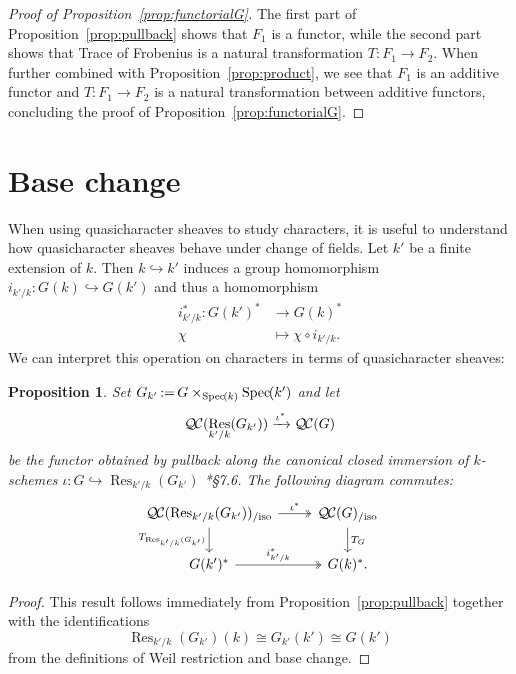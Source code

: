 \documentclass{amsart}
\theoremstyle{plain}
\newtheorem{proposition}[theorem]{Proposition}
\theoremstyle{definition}
\theoremstyle{remark}
\DeclareMathOperator{\Res}{Res}
\newcommand{\Spec}[1]{{\operatorname{Spec}\hskip-1pt( #1 )}}
\newcommand{\ceq}{{\, :=\, }}
\newcommand{\QC}{{\mathcal{Q\hskip-0.8pt C}}}
\newcommand{\QCiso}[1]{\QC(#1)_{/\text{iso}}}
\newcommand{\TrFrob}[1]{T_{#1}}
\begin{document}
\begin{proof}[Proof of Proposition~\ref{prop:functorialG}]
The first part of Proposition~\ref{prop:pullback} shows that $F_1$ is a functor,
while the second part shows that Trace of Frobenius is a natural transformation
$T: F_1 \to F_2$. When further combined with Proposition~\ref{prop:product},
we see that $F_1$ is an additive functor and $T: F_1 \to F_2$ is a natural
transformation between additive functors,
concluding the proof of Proposition~\ref{prop:functorialG}.
\end{proof}

\section{Base change}\label{sec:basechange}

When using quasicharacter sheaves to study characters, it is useful to understand
how quasicharacter sheaves behave under change of fields.
Let $k'$ be a finite extension of $k$. Then $k \hookrightarrow k'$ induces a group homomorphism
$i_{k'/k} : G(k) \hookrightarrow G(k')$ and thus a homomorphism
\begin{align*}
i_{k'/k}^* : G(k')^* &\to G(k)^* \\
\chi &\mapsto \chi\circ i_{k'/k}.
\end{align*}
We can interpret this operation on characters in terms of quasicharacter sheaves:

\begin{proposition} \label{prop:csbe}
Set $G_{k'} \ceq G\times_\Spec{k} \Spec{k'}$ and let
\[
\QC(\Res_{k'/k}(G_{k'})) \xrightarrow{\iota^*} \QC(G)
\]
be the functor obtained by pullback along the canonical closed immersion of $k$-schemes
$\iota : G \hookrightarrow \Res_{k'/k}(G_{k'})$
\cite{bosch-lutkebohmert-reynaud:NeronModels}*{\S 7.6}.
The following diagram commutes:
\[
\begin{tikzcd}
\QCiso{\Res_{k'/k}(G_{k'})} \arrow[two heads]{r}{\iota^*} \dar[swap]{\TrFrob{\Res_{k'/k}(G_{k'})}} & \QCiso{G} \dar{\TrFrob{G}} \\
G(k')^* \arrow[two heads]{r}{i_{k'/k}^*} & G(k)^*.
\end{tikzcd}
\]
\end{proposition}
\begin{proof}
This result follows immediately from Proposition~\ref{prop:pullback} together with the identifications
\[
\Res_{k'/k}(G_{k'})(k) \cong G_{k'}(k') \cong G(k')
\]
from the definitions of Weil restriction and base change.
\end{proof}
\end{document}
